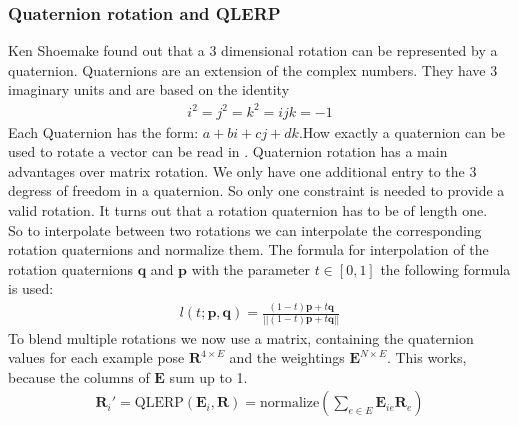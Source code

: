 \subsubsection{Quaternion rotation and QLERP}
Ken Shoemake found out that a 3 dimensional rotation can be represented by a quaternion. Quaternions are an extension of the complex numbers. They have 3 imaginary units and are based on the identity
\begin{align}
i^2=j^2=k^2=ijk=-1
\end{align}
Each Quaternion has the form: $a+ bi+cj+dk$.How exactly a quaternion can be used to rotate a vector can be read in \cite{Quat}.
Quaternion rotation has a main advantages over matrix rotation. We only have one additional entry to the 3 degress of freedom in a quaternion. So only one constraint is needed to provide a valid rotation. It turns out that a rotation quaternion has to be of length one.\\
So to interpolate between two rotations we can interpolate the corresponding rotation quaternions and normalize them. \cite{QLERP}
The formula for interpolation of the rotation quaternions $\bm q$ and $\bm p$ with the parameter $t \in[0,1]$ the following formula is used:
\begin{align}
l(t;\bm{p},\bm{q}) = \frac{(1-t)\bm{p} + t\bm{q}}{||(1-t)\bm{p} + t\bm{q}||}
\end{align}
To blend multiple rotations we now use a matrix, containing the quaternion values for each example pose $\bm{R}^{4\times E}$ and the weightings $\bm{E}^{N\times E}$. This works, because the columns of $\bm{E}$ sum up to 1.
\begin{align}
\bm{R}_i' =\text{QLERP} (\bm{E}_i,\bm{R}) = \text{normalize} \left( \sum_{e\in E} \bm{E}_{ie} \bm{R}_{e}\right)
\end{align}


